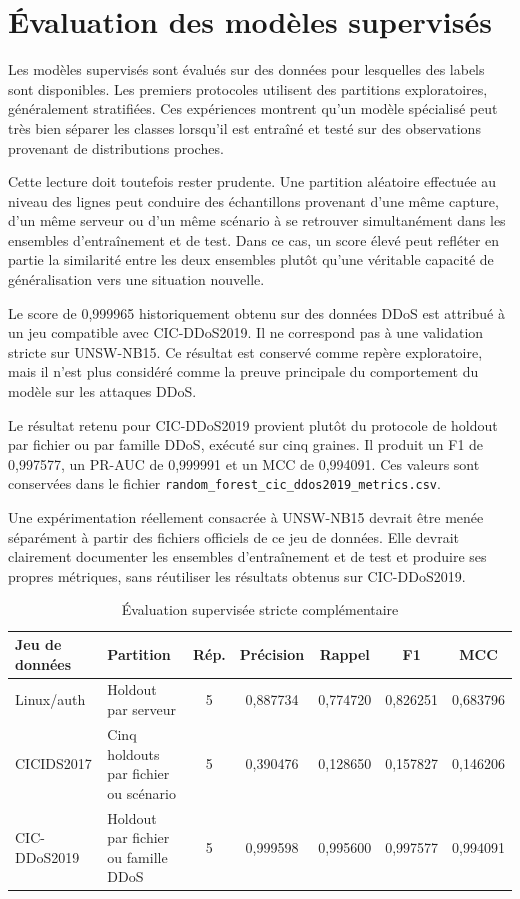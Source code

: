 \section{Évaluation des modèles supervisés}

Les modèles supervisés sont évalués sur des données pour lesquelles des labels sont disponibles. Les premiers protocoles utilisent des partitions exploratoires, généralement stratifiées. Ces expériences montrent qu'un modèle spécialisé peut très bien séparer les classes lorsqu'il est entraîné et testé sur des observations provenant de distributions proches.

Cette lecture doit toutefois rester prudente. Une partition aléatoire effectuée au niveau des lignes peut conduire des échantillons provenant d'une même capture, d'un même serveur ou d'un même scénario à se retrouver simultanément dans les ensembles d'entraînement et de test. Dans ce cas, un score élevé peut refléter en partie la similarité entre les deux ensembles plutôt qu'une véritable capacité de généralisation vers une situation nouvelle.

Le score de 0,999965 historiquement obtenu sur des données DDoS est attribué à un jeu compatible avec CIC-DDoS2019. Il ne correspond pas à une validation stricte sur UNSW-NB15. Ce résultat est conservé comme repère exploratoire, mais il n'est plus considéré comme la preuve principale du comportement du modèle sur les attaques DDoS.

Le résultat retenu pour CIC-DDoS2019 provient plutôt du protocole de holdout par fichier ou par famille DDoS, exécuté sur cinq graines. Il produit un F1 de 0,997577, un PR-AUC de 0,999991 et un MCC de 0,994091. Ces valeurs sont conservées dans le fichier \texttt{random\_forest\_cic\_ddos2019\_metrics.csv}.

Une expérimentation réellement consacrée à UNSW-NB15 devrait être menée séparément à partir des fichiers officiels de ce jeu de données. Elle devrait clairement documenter les ensembles d'entraînement et de test et produire ses propres métriques, sans réutiliser les résultats obtenus sur CIC-DDoS2019.

\begin{table}[H]
\centering
\caption{Évaluation supervisée stricte complémentaire}
\label{tab:supervised-strict-splits}
\scriptsize

\begin{tabularx}{\textwidth}{p{2.2cm}Xccccc}
\toprule
\textbf{Jeu de données} &
\textbf{Partition} &
\textbf{Rép.} &
\textbf{Précision} &
\textbf{Rappel} &
\textbf{F1} &
\textbf{MCC}
\tabularnewline
\midrule

Linux/auth &
Holdout par serveur &
5 &
0,887734 &
0,774720 &
0,826251 &
0,683796
\tabularnewline

CICIDS2017 &
Cinq holdouts par fichier ou scénario &
5 &
0,390476 &
0,128650 &
0,157827 &
0,146206
\tabularnewline

CIC-DDoS2019 &
Holdout par fichier ou famille DDoS &
5 &
0,999598 &
0,995600 &
0,997577 &
0,994091
\tabularnewline

\bottomrule
\end{tabularx}
\end{table}

